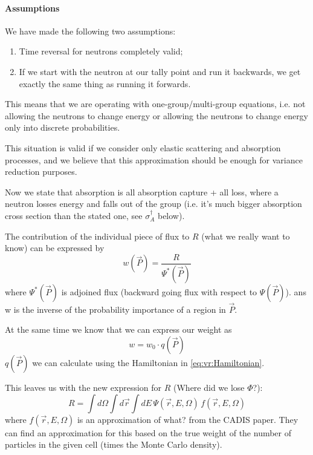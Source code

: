 \paragraph{Assumptions}
We have made the following two assumptions:
\begin{enumerate}
\item Time reversal for neutrons completely valid;
\item If we start with the neutron at our tally point and run it backwards, we get exactly the same thing as running it forwards.
\end{enumerate}
This means that we are operating with one-group/multi-group equations,
i.e. not allowing the neutrons to change energy or allowing the neutrons to change energy only into discrete
probabilities.

This situation is valid if we consider only elastic scattering and absorption processes, and we believe that
this approximation should be enough for variance reduction purposes.

\bigskip


Now we state that absorption is all absorption capture + all loss, where a neutron losses energy and falls out of the group
(i.e. it's much bigger absorption cross section than the stated one, see $\sigma_{A}^\dagger$ below).

The contribution of the individual piece of flux to $R$ (what we really want to know) can be expressed by
\begin{equation}
  \label{eq:vr:w}
  w(\vec{P}) = \frac{R}{\Psi^*(\vec{P})}
\end{equation}
where $\Psi^*(\vec{P})$ is adjoined flux (backward going flux with respect to $\Psi(\vec{P})$).
ans w is the inverse of the probability importance of a region in $\vec{P}$.

At the same time we know that we can express our weight as
\begin{equation}
  \label{eq:vr:w0}
  w = w_0 \cdot q(\vec{P})
\end{equation}
$q(\vec{P})$ we can calculate using the Hamiltonian in \eqref{eq:vr:Hamiltonian}.

This leaves us with the new expression for $R$ (\alert{Where did we lose $\Phi$?}):
\begin{equation}
  \label{eq:vr:R1}
  R = \int d\Omega \int d\vec{r} \int dE \, \Psi(\vec{r},E,\Omega) \, f(\vec{r},E,\Omega)
\end{equation}
where $f(\vec{r},E,\Omega)$ is an approximation \alert{of what?} from the CADIS paper. 
They can find an approximation for this based on the true weight of the number of particles in the given cell
(times the Monte Carlo density).

